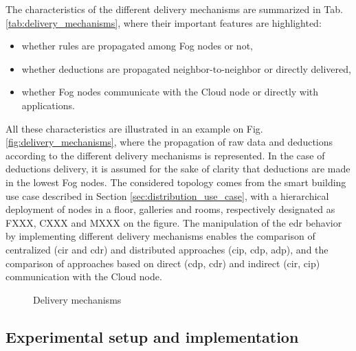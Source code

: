 \documentclass{iosart2c}
\begin{document}
The characteristics of the different delivery mechanisms are summarized in Tab. \ref{tab:delivery_mechanisms}, where their important features are highlighted: 
\begin{itemize}
	\item whether rules are propagated among Fog nodes or not,
	\item whether deductions are propagated neighbor-to-neighbor or directly delivered,
	\item whether Fog nodes communicate with the Cloud node or directly with applications. 
\end{itemize}  

All these characteristics are illustrated in an example on Fig. \ref{fig:delivery_mechanisms}, where the propagation of raw data and deductions according to the different delivery mechanisms is represented. 
In the case of deductions delivery, it is assumed for the sake of clarity that deductions are made in the lowest Fog nodes. 
The considered topology comes from the smart building use case described in Section \textsection \ref{sec:distribution_use_case}, with a hierarchical deployment of nodes in a floor, galleries and rooms, respectively designated as FXXX, CXXX and MXXX on the figure.
The manipulation of the \gls{edr} behavior by implementing different delivery mechanisms enables the comparison of centralized (\gls{cir} and \gls{cdr}) and distributed approaches (\gls{cip}, \gls{cdp}, \gls{adp}), and the comparison of approaches based on direct (\gls{cdp}, \gls{cdr}) and indirect (\gls{cir}, \gls{cip}) communication with the Cloud node. 

	

\begin{figure}
	\centering
	\caption{Delivery mechanisms}
	\scalebox{0.8}{
		
		\label{fig:delivery_mechanisms}	
	}
\end{figure}


\subsection{Experimental setup and implementation}
\label{sec:setup}
\end{document}
